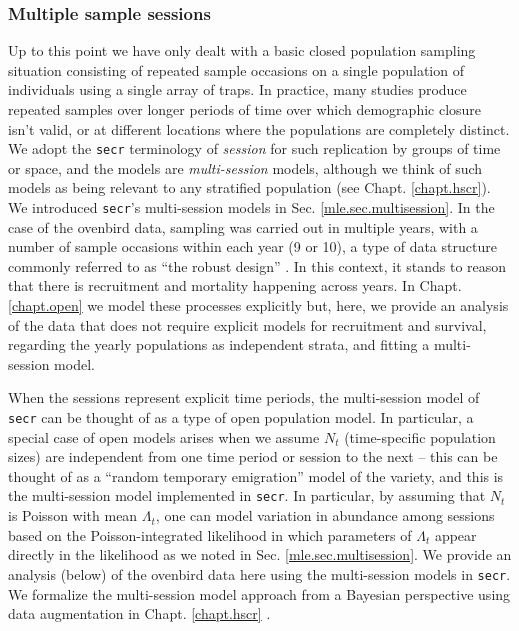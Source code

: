 \subsubsection{Multiple sample sessions}

Up to this point we have only dealt with a basic closed population
sampling situation consisting of repeated sample occasions on a single
population of individuals using a single array of traps. In practice,
many studies produce repeated samples over longer periods of time over
which demographic closure isn't valid, or at different
locations where the populations are completely distinct. We adopt the \mbox{\tt secr} terminology of {\it session}
for such replication by groups of time or space, and the models are
{\it multi-session} models, although we think of such models as being
relevant to any stratified population (see Chapt. \ref{chapt.hscr}).
We introduced \mbox{\tt secr}'s
multi-session models in Sec. \ref{mle.sec.multisession}.  In the case
of the ovenbird data, sampling was carried out in multiple years, with
a number of sample occasions within each year (9 or 10), a type of
data structure commonly referred to as ``the robust
design'' \citep{pollock:1982}.  In this context,
it stands to reason that there is recruitment and mortality happening
across years. In Chapt. \ref{chapt.open} we model these processes
explicitly but, here, we provide an analysis of the data that does not
require explicit models for recruitment and survival, regarding the
yearly populations as independent strata, and fitting a multi-session
model.

When the sessions represent explicit time periods,
the multi-session model of \mbox{\tt secr} 
can be thought of as a type of open population model. 
In particular, a special case of open models arises when
we assume $N_{t}$ (time-specific population sizes) are independent
from one time period or session to the next -- this can be thought of
as a ``random temporary emigration'' model of the
\citet{kendall_etal:1997} variety, and this is the 
multi-session model implemented in \mbox{\tt secr}.  In particular, by
assuming that $N_{t}$ is Poisson with mean $\Lambda_{t}$, one can model
variation in abundance among sessions based on the Poisson-integrated
likelihood in which parameters of $\Lambda_{t}$ appear directly in the
likelihood as we noted in Sec. \ref{mle.sec.multisession}.  We provide
an analysis (below) of the ovenbird data here using the multi-session
models in \mbox{\tt secr}.  We formalize the multi-session model
approach from a Bayesian perspective using data augmentation in
Chapt. \ref{chapt.hscr} \citep{converse_royle:2012,royle_converse:2013}.

